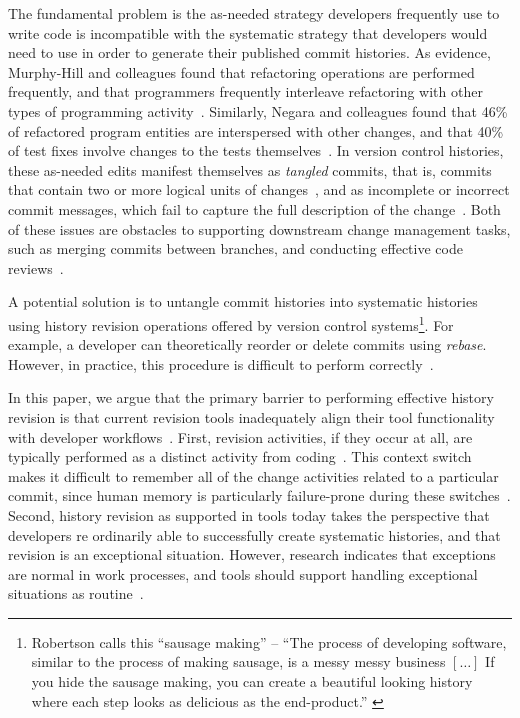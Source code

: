 \documentclass[conference]{IEEEtran}
\newcommand{\purpose}[1]{}
\begin{document}
\purpose{Problem is that strategies are incompatible.} 
The fundamental problem is the as-needed strategy developers frequently use to write code is incompatible with 
the systematic strategy that developers would need to use in order to generate their published commit histories. 
As evidence, Murphy-Hill and colleagues found that refactoring operations are performed frequently, and that programmers 
frequently interleave refactoring with other types of programming activity~\cite{Murphy-Hill2012c}. 
Similarly, Negara and colleagues found that 46\% of refactored program entities are interspersed with other changes, and that 40\% of test fixes involve changes to the tests themselves~\cite{Negara2012}. 
In version control histories, these as-needed edits manifest themselves as \emph{tangled} commits, that is, commits that contain two or more logical units of changes~\cite{Kirinuki2014}, and as incomplete or incorrect commit messages, which fail to capture the full description of the change~\cite{Buse2010,Murphy-Hill2012c}. 
Both of these issues are obstacles to supporting downstream change management tasks, such as merging commits between branches, and conducting effective code reviews~\cite{Kirinuki2014}.

\purpose{History revision gets out of this conflict} 
A potential solution is to untangle commit histories into systematic histories using history revision operations offered by version control systems\footnote{Robertson calls this ``sausage making'' -- ``The process of developing software, 
similar to the process of making sausage, is a messy messy business $[\ldots]$ If you hide the sausage making, 
you can create a beautiful looking history where each step looks as delicious as the end-product.'' 
\cite{SausageMaking}}.
For example, a developer can theoretically reorder or delete commits using \textit{rebase}.
However, in practice, this procedure is difficult to perform correctly~\cite{SausageMaking}.

\purpose{History revisions are not properly supported by tools} 
In this paper, we argue that the primary barrier to performing effective history revision is that current revision tools inadequately align their tool 
functionality with developer workflows~\cite{PerezDeRosso2013}.
First, revision activities, if they occur at all, are typically performed as a distinct activity from coding~\cite{Perry1989}. 
This context switch makes it difficult to remember all of the change activities related to a particular commit, 
since human memory is particularly failure-prone during these switches~\cite{Parnin2012}. 
Second, history revision as supported in tools today takes the perspective that 
developers re ordinarily able to successfully create systematic histories, and that revision is an exceptional situation. However, research indicates that exceptions are normal in work processes, and tools should support handling 
exceptional situations as routine~\cite{Ackerman2000}.
\end{document}
